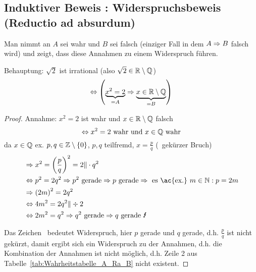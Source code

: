 \subsection{\texorpdfstring{Induktiver Beweis : Widerspruchsbeweis (Reductio ad absurdum)}{Induktiver Beweis II: Widerspruchsbeweis (Reductio ad absurdum)}}
Man nimmt an $A$ sei wahr und $B$ sei falsch (einziger Fall in dem $A \Rightarrow B$ falsch wird) und zeigt, dass diese Annahmen zu einem Widerspruch führen.

\begin{example}
Behauptung: $\sqrt{2}$ ist irrational (also $\sqrt{2} \in \mathbb{R} \setminus \mathbb{Q}$) \[\Leftrightarrow \left(\underbrace{x^2 = 2}_{=A} \Rightarrow \underbrace{x \in \mathbb{R} \setminus \mathbb{Q}}_{=B}\right)\]
\end{example}

\begin{proof}
Annahme: $x^2 = 2$ ist wahr und $x \in \mathbb{R} \setminus \mathbb{Q}$ falsch \[\Leftrightarrow x^2 = 2 \text{ wahr und } x \in \mathbb{Q} \text{ wahr}\]
da $x \in \mathbb{Q}$ \ac{ex.} $p, q \in \mathbb{Z} \setminus \left\{0\right\}$, $p, q$ teilfremd, $x = \frac{p}{q}$ (\ra\ gekürzer Bruch)
\begin{align*}
&\Ra x^2 = \rk{\frac{p}{q}}^2 = 2 \Vert \mal q^2\\
&\Lra p^2 = 2q^2 \Ra p^2 \tx{ gerade} \Ra p \tx{ gerade} \Ra \tx{ es \ac{ex.} } m \in \N: p = 2m\\
&\Ra \rk{2m}^2 = 2q^2\\
&\Lra 4m^2 = 2q^2 \Vert \div 2\\
&\Lra 2m^2 = q^2 \Ra q^2 \tx{ gerade} \Ra q \tx{ gerade \Lightning}
\end{align*}

Das Zeichen \Lightning\ bedeutet Widerspruch, hier $p$ gerade und $q$ gerade, \ac{d.h.} $\frac{p}{q}$ ist nicht gekürzt, damit ergibt sich ein Widerspruch zu der Annahmen, \ac{d.h.} die Kombination der Annahmen ist nicht möglich, \ac{d.h.} Zeile 2 aus Tabelle~\vref{tab:Wahrheitstabelle_A_Ra_B} nicht existent.
\end{proof}

